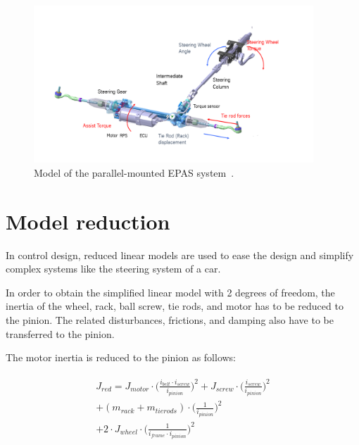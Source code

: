 \begin{figure}[b]
	\begin{center}
		\includegraphics[width=105mm]{figures/parpas_model.png}
		\caption{Model of the parallel-mounted EPAS system~\citep{benyo2013eps}.}
		\label{fig_parpas_model}
	\end{center}
\end{figure}

\section{Model reduction}
\label{sec_model_reduction}

In control design, reduced linear models are used to ease the design and simplify complex systems like the steering system of a car.

In order to obtain the simplified linear model with 2 degrees of freedom, the inertia of the wheel, rack, ball screw, tie rods, and motor has to be reduced to the pinion. The related disturbances, frictions, and damping also have to be transferred to the pinion.

The motor inertia is reduced to the pinion as follows:

\begin{align}
	\begin{split}
		J_{red} = J_{motor} 
		\cdot \Bigg( \frac{i_{belt} \cdot i_{screw}}{i_{pinion}} \Bigg)^{2} 
		+ J_{screw} \cdot \Bigg( \frac{i_{screw}}{i_{pinion}} \Bigg)^{2} \\
		+ (m_{rack} + m_{tierods}) \cdot \Bigg( \frac{1}{i_{pinion}} \Bigg)^{2} \\
		+ 2 \cdot J_{wheel} \cdot 
		\Bigg( \frac{1}{i_{frame} \cdot i_{pinion}} \Bigg)^{2}
	\end{split}
\end{align}

